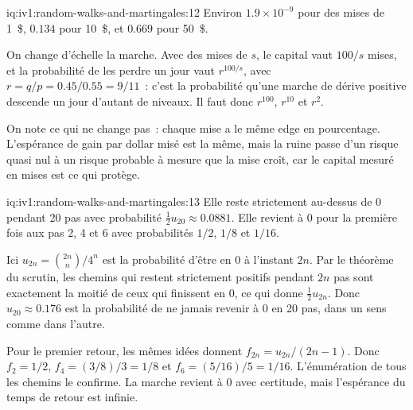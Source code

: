 \begin{solution}{iq:iv1:random-walks-and-martingales:12}
Environ $1.9 \times 10^{-9}$ pour des mises de 1~\$, $0.134$ pour 10~\$, et $0.669$ pour 50~\$.

On change d'échelle la marche. Avec des mises de $s$, le capital vaut $100/s$ mises, et la probabilité de les perdre un jour vaut $r^{100/s}$, avec $r = q/p = 0.45/0.55 = 9/11$~: c'est la probabilité qu'une marche de dérive positive descende un jour d'autant de niveaux. Il faut donc $r^{100}$, $r^{10}$ et $r^2$.

On note ce qui ne change pas~: chaque mise a le même edge en pourcentage. L'espérance de gain par dollar misé est la même, mais la ruine passe d'un risque quasi nul à un risque probable à mesure que la mise croît, car le capital mesuré en mises est ce qui protège.

\end{solution}

\begin{solution}{iq:iv1:random-walks-and-martingales:13}
Elle reste strictement au-dessus de 0 pendant 20 pas avec probabilité $\tfrac12 u_{20} \approx 0.0881$. Elle revient à 0 pour la première fois aux pas 2, 4 et 6 avec probabilités $1/2$, $1/8$ et $1/16$.

Ici $u_{2n} = \binom{2n}{n}/4^n$ est la probabilité d'être en 0 à l'instant $2n$. Par le théorème du scrutin, les chemins qui restent strictement positifs pendant $2n$ pas sont exactement la moitié de ceux qui finissent en 0, ce qui donne $\tfrac12 u_{2n}$. Donc $u_{20} \approx 0.176$ est la probabilité de ne jamais revenir à 0 en 20 pas, dans un sens comme dans l'autre.

Pour le premier retour, les mêmes idées donnent $f_{2n} = u_{2n}/(2n - 1)$. Donc $f_2 = 1/2$, $f_4 = (3/8)/3 = 1/8$ et $f_6 = (5/16)/5 = 1/16$. L'énumération de tous les chemins le confirme. La marche revient à 0 avec certitude, mais l'espérance du temps de retour est infinie.

\end{solution}


